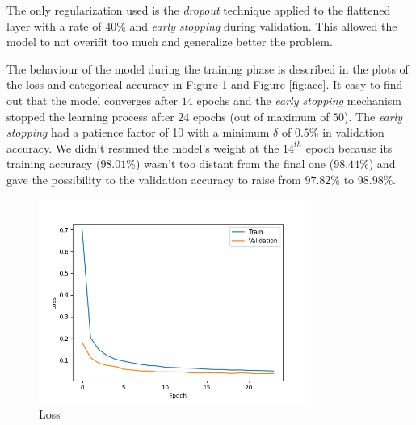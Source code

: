 \documentclass[compsoc]{IEEEtran}
\begin{document}
The only regularization used is the \emph{dropout} technique applied to the flattened layer with a rate of $40\%$ and \emph{early stopping} during validation. This allowed the model to not overifit too much and generalize better the problem. \par
The behaviour of the model during the training phase is described in the plots of the loss and categorical accuracy in 
Figure \ref{fig:loss} and Figure \ref{fig:acc}. 
It easy to find out that the model converges after $14$ epochs and the \emph{early stopping} mechanism stopped the learning process after $24$ epochs (out of maximum of $50$). The \emph{early stopping} had a patience factor of 10 with a minimum $\delta$ of $0.5\%$ in validation accuracy.
We didn't resumed the model's weight at the $14^{th}$ epoch because its training accuracy ($98.01\%$) wasn't too distant from the final one ($98.44\%$) and gave the possibility to the validation accuracy to raise from $97.82\%$ to $98.98\%$.
\begin{figure}[ht!]
\centering                                                                        
\includegraphics[width=3.5in]{loss.png}
\captionsetup{justification=centering}                                                                                         
\caption{Loss}
\label{fig:loss}                                                                                                                               
\end{figure}
\end{document}
